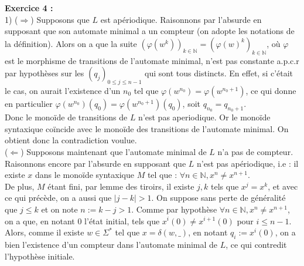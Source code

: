\documentclass[11pt,a4paper]{article}
\begin{document}
\textbf{Exercice 4 :} \\

1) ($\Rightarrow$) Supposons que $L$ est apériodique. Raisonnons par l'absurde en supposant que son automate minimal a un compteur (on adopte les notations de la définition). Alors on a que la suite $(\varphi(w^k))_{k \in \mathbb{N}}=(\varphi(w)^k)_{k \in \mathbb{N}}$, où $\varphi$ est le morphisme de transitions de l'automate minimal, n'est pas constante a.p.c.r par hypothèses sur les $(q_j)_{0 \leq j \leq n-1}$ qui sont tous distincts. En effet, si c'était le cas, on aurait l'existence d'un $n_0$ tel que $\varphi(w^{n_0})=\varphi(w^{n_0 +1})$, ce qui donne en particulier $\varphi(w^{n_0})(q_0)=\varphi(w^{n_0 +1})(q_0)$, soit $q_{n_0} = q_{n_0 +1}$.\\
 Donc le monoïde de transitions de $L$ n'est pas aperiodique. Or le monoïde syntaxique coïncide avec le monoïde des transitions de l’automate minimal. On obtient donc la contradiction voulue. \\
 
($\Leftarrow$) Supposons maintenant que l'automate minimal de $L$ n'a pas de compteur. Raisonnons encore par l'absurde en supposant que $L$ n'est pas apériodique, i.e : il existe $x$ dans le monoïde syntaxique $M$ tel que : $\forall n \in \mathbb{N}, x^n \neq x^{n+1}$.\\ De plus, $M$ étant fini, par lemme des tiroirs, il existe $j,k$ tels que $x^j=x^k$, et avec ce qui précède, on a aussi que  $|j-k| > 1$. On suppose sans perte de généralité que $j \leq k$ et on note $n := k-j > 1$. Comme par hypothèse $\forall n \in \mathbb{N}, x^n \neq x^{n+1}$, on a que, en notant $0$ l'état initial, tels que $x^i(0) \neq x^{i+1}(0)$ pour $i \leq n-1$. Alors, comme il existe $w \in \Sigma^*$ tel que $x = \delta(w,\_)$, en notant $q_i :=  x^i(0) $, on a bien l'existence d'un compteur dans l'automate minimal de $L$, ce qui contredit l'hypothèse initiale.
\end{document}

